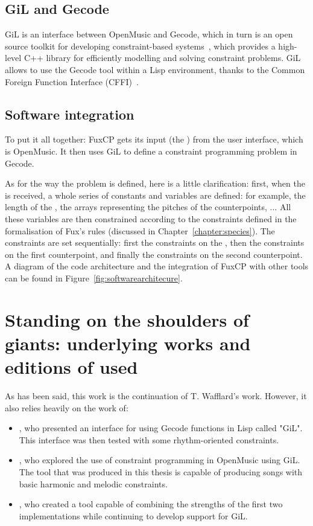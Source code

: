 \subsection{GiL and Gecode}
GiL is an interface between OpenMusic and Gecode, which in turn is an open source toolkit for developing constraint-based systems~\cite{Gecode}, which provides a high-level C++ library for efficiently modelling and solving constraint problems. GiL allows to use the Gecode tool within a Lisp environment, thanks to the Common Foreign Function Interface (CFFI)~\cite{CFFI}.

\subsection{Software integration}
To put it all together: FuxCP gets its input (the \cf) from the user interface, which is OpenMusic. It then uses GiL to define a constraint programming problem in Gecode.

As for the way the problem is defined, here is a little clarification: first, when the \cfs is received, a whole series of constants and variables are defined: for example, the length of the \cf, the arrays representing the pitches of the counterpoints, ...
All these variables are then constrained according to the constraints defined in the formalisation of Fux's rules (discussed in Chapter~\ref{chapter:species}). The constraints are set sequentially: first the constraints on the \cf, then the constraints on the first counterpoint, and finally the constraints on the second counterpoint. A diagram of the code architecture and the integration of FuxCP with other tools can be found in Figure~\ref{fig:softwarearchitecure}.



\section{Standing on the shoulders of giants: underlying works and editions of \gaps used}
As has been said, this work is the continuation of T. Wafflard's work. However, it also relies heavily on the work of:
\begin{itemize}
    \item \textcite{GiLthesis}, who presented an interface for using Gecode functions in Lisp called "GiL". This interface was then tested with some rhythm-oriented constraints.
    \item \textcite{Melothesis}, who explored the use of constraint programming in OpenMusic using GiL. The tool that was produced in this thesis is capable of producing songs with basic harmonic and melodic constraints.
    \item \textcite{Melo2thesis}, who created a tool capable of combining the strengths of the first two implementations while continuing to develop support for GiL.
\end{itemize}

